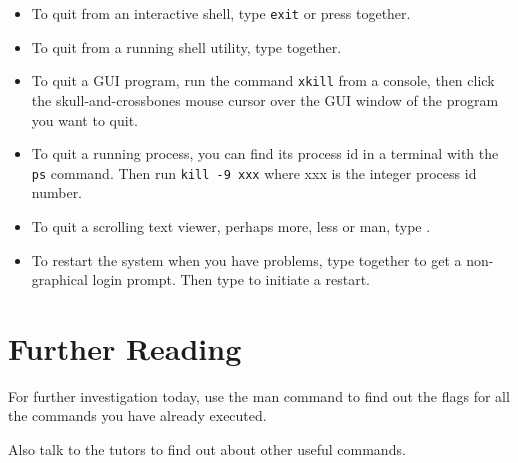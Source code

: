 \documentclass{article}
\begin{document}
\begin{itemize}
\item To quit from an interactive shell, type \texttt{exit} or press
 together.
\item To quit from a running shell utility, type  together.
\item To quit a GUI program, run the command \texttt{xkill} from a console, then click the skull-and-crossbones mouse cursor over the GUI window of the program you want to quit.
\item To quit a running process, you can find its process id in a terminal with the \texttt{ps} command. Then run \lstinline{kill -9 xxx} where xxx is the integer process id number.
\item To quit a scrolling text viewer, perhaps more, less or man, type .
\item To restart the system when you have problems, type  together to get a non-graphical login prompt. Then type
   to initiate a restart.
\end{itemize}

\section*{Further Reading}

For further investigation today, use the man command to find out 
the flags for all the commands you have already executed.

Also talk to the tutors to find out about other useful commands.
\end{document}
